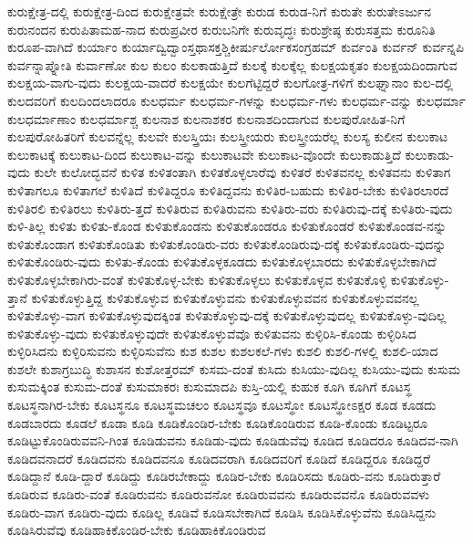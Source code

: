 {ಕುರುಕ್ಷೇತ್ರ-ದಲ್ಲಿ
ಕುರುಕ್ಷೇತ್ರ-ದಿಂದ
ಕುರುಕ್ಷೇತ್ರವೇ
ಕುರುಕ್ಷೇತ್ರೇ
ಕುರುಡ
ಕುರುಡ-ನಿಗೆ
ಕುರುತೇ
ಕುರುತೇಽರ್ಜುನ
ಕುರುನಂದನ
ಕುರುಪಿತಾಮಹ-ನಾದ
ಕುರುಪ್ರವೀರ
ಕುರುಬನಿಗೇ
ಕುರುವೃದ್ಧಃ
ಕುರುಶ್ರೇಷ್ಠ
ಕುರುಸತ್ತಮ
ಕುರೂನಿತಿ
ಕುರೂಪ-ವಾಗಿದೆ
ಕುರ್ಯಾಂ
ಕುರ್ಯಾದ್ವಿದ್ವಾಂಸ್ತಥಾಸಕ್ತಶ್ಚಿಕೀರ್ಷುರ್ಲೋಕಸಂಗ್ರಹಮ್
ಕುರ್ವಂತಿ
ಕುರ್ವನ್
ಕುರ್ವನ್ನಪಿ
ಕುರ್ವನ್ನಾಪ್ನೋತಿ
ಕುರ್ವಾಣೋ
ಕುಲ
ಕುಲಂ
ಕುಲಕಾಡುತ್ತಿದೆ
ಕುಲಕ್ಕೆ
ಕುಲಕ್ಕೆಲ್ಲ
ಕುಲಕ್ಷಯಕೃತಂ
ಕುಲಕ್ಷಯದಿಂದಾಗುವ
ಕುಲಕ್ಷಯ-ವಾಗು-ವುದು
ಕುಲಕ್ಷಯ-ವಾದರೆ
ಕುಲಕ್ಷಯೇ
ಕುಲಗೆಟ್ಟಿದ್ದರೆ
ಕುಲಗೋತ್ರ-ಗಳಿಗೆ
ಕುಲಘ್ನಾನಾಂ
ಕುಲ-ದಲ್ಲಿ
ಕುಲದವರಿಗೆ
ಕುಲದಿಂದಲಾದರೂ
ಕುಲಧರ್ಮ
ಕುಲಧರ್ಮ-ಗಳನ್ನು
ಕುಲಧರ್ಮ-ಗಳು
ಕುಲಧರ್ಮ-ವನ್ನು
ಕುಲಧರ್ಮಾ
ಕುಲಧರ್ಮಾಣಾಂ
ಕುಲಧರ್ಮಾಶ್ಚ
ಕುಲನಾಶ
ಕುಲನಾಶಕರ
ಕುಲನಾಶದಿಂದಾಗುವ
ಕುಲಪುರೋಹಿತ-ನಿಗೆ
ಕುಲಪುರೋಹಿತರಿಗೆ
ಕುಲವನ್ನೆಲ್ಲ
ಕುಲವೇ
ಕುಲಸ್ತ್ರಿಯಃ
ಕುಲಸ್ತ್ರೀಯರು
ಕುಲಸ್ತ್ರೀಯರೆಲ್ಲ
ಕುಲಸ್ಯ
ಕುಲೀನ
ಕುಲುಕಾಟ
ಕುಲುಕಾಟಕ್ಕೆ
ಕುಲುಕಾಟ-ದಿಂದ
ಕುಲುಕಾಟ-ವನ್ನು
ಕುಲುಕಾಟವೇ
ಕುಲುಕಾಟ-ವೊಂದೇ
ಕುಲುಕಾಡುತ್ತಿದೆ
ಕುಲುಕಾಡು-ವುದು
ಕುಲೇ
ಕುಲೋದ್ಭವನೆ
ಕುಳಿತ
ಕುಳಿತಂತಾಗಿ
ಕುಳಿತಕೊಳ್ಳಲಾರೆವು
ಕುಳಿತರೆ
ಕುಳಿತವನಲ್ಲ
ಕುಳಿತವನು
ಕುಳಿತಾಗ
ಕುಳಿತಾಗಲೂ
ಕುಳಿತಾಗಲೆ
ಕುಳಿತಿದೆ
ಕುಳಿತಿದ್ದರೂ
ಕುಳಿತಿದ್ದವನು
ಕುಳಿತಿರ-ಬಹುದು
ಕುಳಿತಿರ-ಬೇಕು
ಕುಳಿತಿರಲಾರದೆ
ಕುಳಿತಿರಲಿ
ಕುಳಿತಿರಲು
ಕುಳಿತಿರು-ತ್ತದೆ
ಕುಳಿತಿರುವ
ಕುಳಿತಿರುವನು
ಕುಳಿತಿರು-ವರು
ಕುಳಿತಿರುವು-ದಕ್ಕೆ
ಕುಳಿತಿರು-ವುದು
ಕುಳಿ-ತಿಲ್ಲ
ಕುಳಿತು
ಕುಳಿತು-ಕೊಂಡ
ಕುಳಿತುಕೊಂಡನು
ಕುಳಿತುಕೊಂಡರೂ
ಕುಳಿತುಕೊಂಡರೆ
ಕುಳಿತುಕೊಂಡವ-ನನ್ನು
ಕುಳಿತುಕೊಂಡಾಗ
ಕುಳಿತುಕೊಂಡಿತು
ಕುಳಿತುಕೊಂಡಿರು-ವರು
ಕುಳಿತುಕೊಂಡಿರುವು-ದಕ್ಕೆ
ಕುಳಿತುಕೊಂಡಿರು-ವುದನ್ನು
ಕುಳಿತುಕೊಂಡಿರು-ವುದು
ಕುಳಿತು-ಕೊಂಡು
ಕುಳಿತುಕೊಳ್ಳಕೂಡದು
ಕುಳಿತುಕೊಳ್ಳಬಾರದು
ಕುಳಿತುಕೊಳ್ಳಬೇಕಾಗಿದೆ
ಕುಳಿತುಕೊಳ್ಳಬೇಕಾಗಿರು-ವಂತೆ
ಕುಳಿತುಕೊಳ್ಳ-ಬೇಕು
ಕುಳಿತುಕೊಳ್ಳಲು
ಕುಳಿತುಕೊಳ್ಳವ
ಕುಳಿತುಕೊಳ್ಳಿ
ಕುಳಿತುಕೊಳ್ಳು-ತ್ತಾನೆ
ಕುಳಿತುಕೊಳ್ಳುತ್ತಿದ್ದ
ಕುಳಿತುಕೊಳ್ಳುವ
ಕುಳಿತುಕೊಳ್ಳುವನು
ಕುಳಿತುಕೊಳ್ಳುವವನ
ಕುಳಿತುಕೊಳ್ಳುವವನಲ್ಲ
ಕುಳಿತುಕೊಳ್ಳು-ವಾಗ
ಕುಳಿತುಕೊಳ್ಳುವುದಕ್ಕಿಂತ
ಕುಳಿತುಕೊಳ್ಳುವು-ದಕ್ಕೆ
ಕುಳಿತುಕೊಳ್ಳುವುದಲ್ಲ
ಕುಳಿತುಕೊಳ್ಳು-ವುದಿಲ್ಲ
ಕುಳಿತುಕೊಳ್ಳು-ವುದು
ಕುಳಿತುಕೊಳ್ಳುವುದೇ
ಕುಳಿತುಕೊಳ್ಳುವೆವೊ
ಕುಳಿತುವನು
ಕುಳ್ಳಿರಿಸಿ-ಕೊಂಡು
ಕುಳ್ಳಿರಿಸಿದ
ಕುಳ್ಳಿರಿಸಿದನು
ಕುಳ್ಳಿರಿಸುವನು
ಕುಳ್ಳಿರಿಸುವೆನು
ಕುಶ
ಕುಶಲ
ಕುಶಲಕಲೆ-ಗಳು
ಕುಶಲಿ
ಕುಶಲಿ-ಗಳಲ್ಲಿ
ಕುಶಲಿ-ಯಾದ
ಕುಶಲೇ
ಕುಶಾಗ್ರಬುದ್ಧಿ
ಕುಶಾಸನ
ಕುಶೋತ್ತರಮ್
ಕುಸಮ-ದಂತೆ
ಕುಸಿದು
ಕುಸಿಯು-ವುದಿಲ್ಲ
ಕುಸಿಯು-ವುದು
ಕುಸುಮ
ಕುಸುಮಕ್ಕಿಂತ
ಕುಸುಮ-ದಂತೆ
ಕುಸುಮಾಕರಃ
ಕುಸುಮಾದಪಿ
ಕುಸ್ತಿ-ಯಲ್ಲಿ
ಕುಹುಕ
ಕೂಗಿ
ಕೂಗಿಗೆ
ಕೂಟಸ್ಥ
ಕೂಟಸ್ಥನಾಗಿರ-ಬೇಕು
ಕೂಟಸ್ಥನೂ
ಕೂಟಸ್ಥಮಚಲಂ
ಕೂಟಸ್ಥವೂ
ಕೂಟಸ್ಥೋ
ಕೂಟಸ್ಥೋಽಕ್ಷರ
ಕೂಡ
ಕೂಡದು
ಕೂಡಬಾರದು
ಕೂಡಲೆ
ಕೂಡಾ
ಕೂಡಿ
ಕೂಡಿಕೊಂಡಿರ-ಬೇಕು
ಕೂಡಿಕೊಂಡಿರುವ
ಕೂಡಿ-ಕೊಂಡು
ಕೂಡಿಟ್ಟರೂ
ಕೂಡಿಟ್ಟುಕೊಂಡಿರುವವನಿ-ಗಿಂತ
ಕೂಡಿಡುವನು
ಕೂಡಿಡು-ವುದು
ಕೂಡಿಡುವೆವು
ಕೂಡಿದ
ಕೂಡಿದರೂ
ಕೂಡಿದವ-ನಾಗಿ
ಕೂಡಿದವನಾದರೆ
ಕೂಡಿದವನು
ಕೂಡಿದವನೂ
ಕೂಡಿದವರಾಗಿ
ಕೂಡಿದವರಿಗೆ
ಕೂಡಿದೆ
ಕೂಡಿದ್ದರೂ
ಕೂಡಿದ್ದರೆ
ಕೂಡಿದ್ದಾನೆ
ಕೂಡಿ-ದ್ದಾರೆ
ಕೂಡಿದ್ದು
ಕೂಡಿರಬೇಕಾದ್ದು
ಕೂಡಿರ-ಬೇಕು
ಕೂಡಿರಿಸದು
ಕೂಡಿರು-ವನು
ಕೂಡಿರುತ್ತಾರೆ
ಕೂಡಿರುವ
ಕೂಡಿರು-ವಂತೆ
ಕೂಡಿರುವನು
ಕೂಡಿರುವನೋ
ಕೂಡಿರುವವನು
ಕೂಡಿರುವವನೊ
ಕೂಡಿರುವವಳು
ಕೂಡಿರು-ವಾಗ
ಕೂಡಿರು-ವುದು
ಕೂಡಿಲ್ಲ
ಕೂಡಿವೆ
ಕೂಡಿಸಬೇಕಾಗಿದೆ
ಕೂಡಿಸಿ
ಕೂಡಿಸಿಕೊಳ್ಳುವೆನು
ಕೂಡಿಸಿದ್ದನು
ಕೂಡಿಸಿರುವೆವು
ಕೂಡಿಹಾಕಿಕೊಂಡಿರ-ಬೇಕು
ಕೂಡಿಹಾಕಿಕೊಂಡಿರುವ
}

